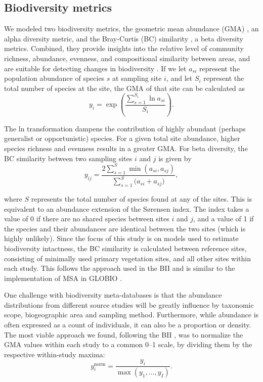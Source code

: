 
\subsection*{Biodiversity metrics}

We modeled two biodiversity metrics, the geometric mean abundance (GMA) \cite{santini2017}, an alpha diversity metric, and the Bray-Curtis (BC) similarity \cite{bray1957}, a beta diversity metrics. Combined, they provide insights into the relative level of community richness, abundance, evenness, and compositional similarity between areas, and are suitable for detecting changes in biodiversity \cite{santini2017}. If we let $a_{si}$ represent the population abundance of species $s$ at sampling site $i$, and let $S_i$ represent the total number of species at the site, the GMA of that site can be calculated as
\vspace{0.25\baselineskip}
\begin{equation*}
    y_i = \exp\left(\frac{\sum_{s=1}^{S_i} \ln a_{si}}{S_i}\right).
\end{equation*}

The ln transformation dampens the contribution of highly abundant (perhaps generalist or opportunistic) species. For a given total site abundance, higher species richness and evenness results in a greater GMA. For beta diversity, the BC similarity between two sampling sites $i$ and $j$ is given by
\vspace{0.25\baselineskip}
\begin{equation*}
    y_{ij} = \frac{2\sum_{s=1}^S \min(a_{si},a_{sj})}{\sum_{s=1}^S \big(a_{si}+a_{sj}\big)},
\end{equation*}

where $S$ represents the total number of species found at any of the sites. This is equivalent to an abundance extension of the Sørensen index. The index takes a value of 0 if there are no shared species between sites $i$ and $j$, and a value of 1 if the species and their abundances are identical between the two sites (which is highly unlikely). Since the focus of this study is on models used to estimate biodiversity intactness, the BC similarity is calculated between reference sites, consisting of minimally used primary vegetation sites, and all other sites within each study. This follows the approach used in the BII\cite{depalma2021} and is similar to the implementation of MSA in GLOBIO \cite{schipper2020}.

\vspace{0.25\baselineskip}
One challenge with biodiversity meta-databases is that the abundance distributions from different source studies will be greatly influence by taxonomic scope, biogeographic area and sampling method. Furthermore, while abundance is often expressed as a count of individuals, it can also be a proportion or density. The most viable approach we found, following the BII \cite{depalma2021}, was to normalize the GMA values within each study to a common 0--1 scale, by dividing them by the respective within-study maxima:
\begin{equation*}
    y_i^{\text{norm}} = \frac{y_i}{\max(y_1,\ldots,y_I)}.
\end{equation*}

